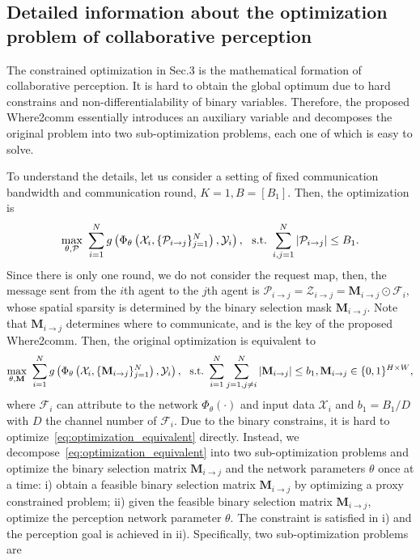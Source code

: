 \subsection{Detailed information about the optimization problem of collaborative perception}
The constrained optimization in Sec.3 is the mathematical formation of collaborative perception. It is hard to obtain the global optimum due to hard constrains and non-differentialability of binary variables. Therefore, the proposed Where2comm essentially introduces an auxiliary variable and decomposes the original problem into two sub-optimization problems, each one of which is easy to solve.

To understand the details, let us consider a setting of fixed communication bandwidth and communication round, $K=1,B=[B_1]$. Then, the optimization is
\vspace{-1mm}
\begin{equation*}
    \underset{\theta,\mathcal{P}}{\max}~\sum_{i=1}^{N} 
    g \left(\Phi_{\theta} \left(\mathcal{X}_i,\{\mathcal{P}_{i\rightarrow j} \}_{j=1}^N \right), \mathcal{Y}_i  \right),~
    ~{\rm s.t.~} \sum_{i,j=1}^{N}|\mathcal{P}_{i\rightarrow j}| \leq B_1.
\end{equation*}
Since there is only one round, we do not consider the request map, then, the message sent from the $i$th agent to the $j$th agent is 
$\mathcal{P}_{i\rightarrow j}
= \mathcal{Z}_{i\rightarrow j} 
= \mathbf{M}_{i\rightarrow j} \odot \mathcal{F}_i,$ whose spatial sparsity is determined by the binary selection mask $\mathbf{M}_{i\rightarrow j}$. Note that $\mathbf{M}_{i\rightarrow j}$ determines where to communicate, and is the key of the proposed Where2comm. Then, the original optimization is equivalent to 
\begin{equation}
\label{eq:optimization_equivalent}
    \underset{\theta,\mathbf{M}}{\max}~\sum_{i=1}^{N} 
    g \left(\Phi_{\theta} \left(\mathcal{X}_i,\{\mathbf{M}_{i\rightarrow j}\}_{j=1}^N 
    \right), \mathcal{Y}_i  \right),~
    ~{\rm s.t.~} \sum_{i=1}^{N}\sum_{j=1,j\neq i}^{N}|\mathbf{M}_{i\rightarrow j}| \leq b_1, \mathbf{M}_{i\rightarrow j}\in\{0,1\}^{H\times W},
\end{equation}
where $\mathcal{F}_i$ can attribute to the network $\Phi_{\theta}(\cdot)$ and input data $\mathcal{X}_i$ and $b_1 = B_1/D$ with $D$ the channel number of $\mathcal{F}_i$. Due to the binary constrains, it is hard to optimize~\eqref{eq:optimization_equivalent} directly. Instead, we decompose~\eqref{eq:optimization_equivalent} into two sub-optimization problems and optimize the binary selection matrix  $\mathbf{M}_{i\rightarrow j}$ and the network parameters $\theta$ once at a time: i) obtain a feasible binary selection matrix $\mathbf{M}_{i\rightarrow j}$ by optimizing a proxy constrained problem; ii) given the feasible binary selection matrix $\mathbf{M}_{i\rightarrow j}$, optimize the perception network parameter $\theta$. The constraint is satisfied in i) and the perception goal is achieved in ii). Specifically, two sub-optimization problems are

